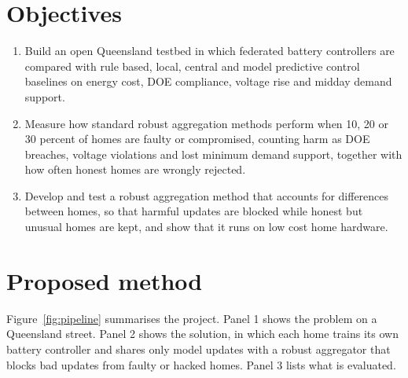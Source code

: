 \documentclass[11pt,a4paper]{article}
\begin{document}
\section{Objectives}

\begin{enumerate}
  \item Build an open Queensland testbed in which federated battery controllers are compared with rule based, local, central and model predictive control baselines on energy cost, DOE compliance, voltage rise and midday demand support.
  \item Measure how standard robust aggregation methods perform when 10, 20 or 30 percent of homes are faulty or compromised, counting harm as DOE breaches, voltage violations and lost minimum demand support, together with how often honest homes are wrongly rejected.
  \item Develop and test a robust aggregation method that accounts for differences between homes, so that harmful updates are blocked while honest but unusual homes are kept, and show that it runs on low cost home hardware.
\end{enumerate}

\section{Proposed method}

Figure~\ref{fig:pipeline} summarises the project. Panel 1 shows the problem on a Queensland street. Panel 2 shows the solution, in which each home trains its own battery controller and shares only model updates with a robust aggregator that blocks bad updates from faulty or hacked homes. Panel 3 lists what is evaluated.
\end{document}
